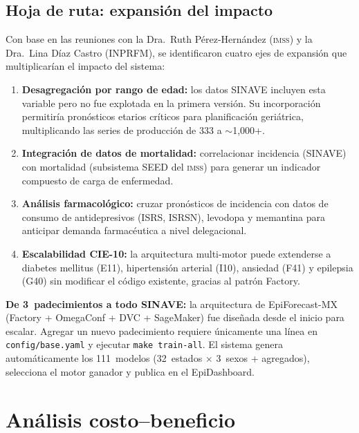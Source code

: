 \documentclass[12pt, letterpaper]{article}
\newenvironment{insightbox}[1][]{\par\medskip\begin{lrbox}{\boxcontents}\begin{minipage}{\dimexpr\textwidth-12pt}\setlength{\emergencystretch}{5em}\setlength{\parskip}{6pt}}{\end{minipage}\end{lrbox}\noindent\colorbox{lightgreen}{\usebox{\boxcontents}}\par\medskip}
\newcommand{\imss}{\textnormal{\textsc{imss}}}
\begin{document}
\subsection{Hoja de ruta: expansión del impacto}

Con base en las reuniones con la Dra.~Ruth Pérez-Hernández (\imss{}) y la Dra.~Lina Díaz Castro (INPRFM), se identificaron cuatro ejes de expansión que multiplicarían el impacto del sistema:

\begin{enumerate}
  \item \textbf{Desagregación por rango de edad:} los datos SINAVE incluyen esta variable pero no fue explotada en la primera versión. Su incorporación permitiría pronósticos etarios críticos para planificación geriátrica, multiplicando las series de producción de 333 a $\sim$1,000+.
  \item \textbf{Integración de datos de mortalidad:} correlacionar incidencia (SINAVE) con mortalidad (subsistema SEED del \imss{}) para generar un indicador compuesto de carga de enfermedad.
  \item \textbf{Análisis farmacológico:} cruzar pronósticos de incidencia con datos de consumo de antidepresivos (ISRS, ISRSN), levodopa y memantina para anticipar demanda farmacéutica a nivel delegacional.
  \item \textbf{Escalabilidad CIE-10:} la arquitectura multi-motor puede extenderse a diabetes mellitus (E11), hipertensión arterial (I10), ansiedad (F41) y epilepsia (G40) sin modificar el código existente, gracias al patrón Factory.
\end{enumerate}

\begin{insightbox}
\textbf{De 3~padecimientos a todo SINAVE:} la arquitectura de EpiForecast-MX (Factory + OmegaConf + DVC + SageMaker) fue diseñada desde el inicio para escalar. Agregar un nuevo padecimiento requiere únicamente una línea en \texttt{config/base.yaml} y ejecutar \texttt{make train-all}. El sistema genera automáticamente los 111~modelos (32~estados $\times$ 3~sexos + agregados), selecciona el motor ganador y publica en el EpiDashboard.
\end{insightbox}

\newpage
\section{Análisis costo--beneficio}\label{sec:costos}
\end{document}
